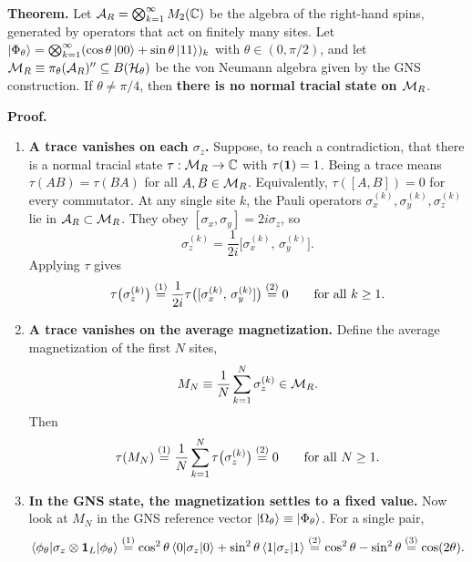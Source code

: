 \begin{keyresult}[: No normalized trace away from $\theta=\pi/4$]
\textbf{Theorem.} Let $\mathcal{A}_R = \bigotimes_{k=1}^\infty M_2(\mathbb{C})$ be the algebra of the right-hand spins,
generated by operators that act on finitely many sites. Let
$\ket{\Phi_\theta} = \bigotimes_{k=1}^\infty (\cos\theta\ket{00} + \sin\theta\ket{11})_k$ with
$\theta \in (0, \pi/2)$, and let $\mathcal{M}_R \equiv \pi_\theta(\mathcal{A}_R)'' \subseteq B(\mathcal{H}_\theta)$ be the von Neumann
algebra given by the GNS construction. If $\theta \ne \pi/4$, then \textbf{there is no normal tracial state on
$\mathcal{M}_R$}.

\textbf{Proof.}
\begin{enumerate}[leftmargin=*]
\item \textbf{A trace vanishes on each $\sigma_z$.}
Suppose, to reach a contradiction, that there is a normal tracial state $\tau: \mathcal{M}_R \to \mathbb{C}$ with
$\tau(\mathbf{1}) = 1$. Being a trace means $\tau(AB) = \tau(BA)$ for all $A, B \in \mathcal{M}_R$. Equivalently, $\tau([A,
B]) = 0$ for every commutator. At any single site $k$, the Pauli operators $\sigma_x^{(k)}, \sigma_y^{(k)},
\sigma_z^{(k)}$ lie in $\mathcal{A}_R \subset \mathcal{M}_R$. They obey $[\sigma_x, \sigma_y] = 2i\sigma_z$, so
\[
\sigma_z^{(k)} = \frac{1}{2i}\big[\sigma_x^{(k)}, \, \sigma_y^{(k)}\big] .
\]
Applying $\tau$ gives
\begin{align}
\tau\big(\sigma_z^{(k)}\big) \overset{(1)}{=} \frac{1}{2i}\tau\big([\sigma_x^{(k)}, \, \sigma_y^{(k)}]\big)
\overset{(2)}{=} 0 \qquad \text{for all } k \ge 1 . \notag
\end{align}
\quad
{}

\item \textbf{A trace vanishes on the average magnetization.}
Define the average magnetization of the first $N$ sites,
\[
M_N \equiv \frac{1}{N}\sum_{k=1}^N \sigma_z^{(k)} \in \mathcal{M}_R .
\]
Then
\begin{align}
\tau(M_N) \overset{(1)}{=} \frac{1}{N}\sum_{k=1}^N \tau\big(\sigma_z^{(k)}\big) \overset{(2)}{=} 0
\qquad \text{for all } N \ge 1 . \notag
\end{align}
\quad
{}

\item \textbf{In the GNS state, the magnetization settles to a fixed value.}
Now look at $M_N$ in the GNS reference vector $\ket{\Omega_\theta} \equiv \ket{\Phi_\theta}$. For a single
pair,
\begin{align}
\braket{\phi_\theta | \sigma_z\otimes\mathbf{1}_L | \phi_\theta}
\overset{(1)}{=} \cos^2\theta \braket{0|\sigma_z|0} + \sin^2\theta \braket{1|\sigma_z|1}
\overset{(2)}{=} \cos^2\theta - \sin^2\theta
\overset{(3)}{=} \cos(2\theta) . \notag
\end{align}
\quad
{}\quad
{}


\end{enumerate}
\end{keyresult}
